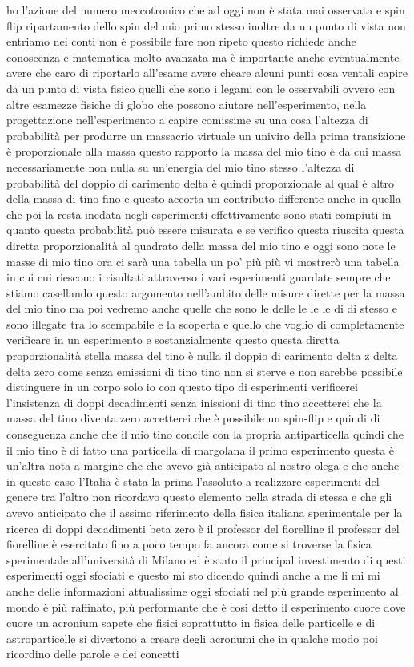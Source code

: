ho l'azione del numero meccotronico che ad oggi non è stata mai osservata e spin flip ripartamento dello spin del mio primo stesso inoltre da un punto di vista non entriamo nei conti non è possibile fare non ripeto questo richiede anche conoscenza e matematica molto avanzata ma è importante anche eventualmente avere che caro di riportarlo all'esame avere cheare alcuni punti cosa ventali capire da un punto di vista fisico quelli che sono i legami con le osservabili ovvero con altre esamezze fisiche di globo che possono aiutare nell'esperimento, nella progettazione nell'esperimento a capire comissime su una cosa l'altezza di probabilità per produrre un massacrio virtuale un univiro della prima transizione è proporzionale alla massa questo rapporto la massa del mio tino è da cui massa necessariamente non nulla su un'energia del mio tino stesso l'altezza di probabilità del doppio di carimento delta è quindi proporzionale al qual è altro della massa di tino fino e questo accorta un contributo differente anche in quella che poi la resta inedata negli esperimenti effettivamente sono stati compiuti in quanto questa probabilità può essere misurata e se verifico questa riuscita questa diretta proporzionalità al quadrato della massa del mio tino e oggi sono note le masse di mio tino ora ci sarà una tabella un po' più più vi mostrerò una tabella in cui cui riescono i risultati attraverso i vari esperimenti guardate sempre che stiamo casellando questo argomento nell'ambito delle misure dirette per la massa del mio tino ma poi vedremo anche quelle che sono le delle le le le di di stesso e sono illegate tra lo scempabile e la scoperta e quello che voglio di completamente verificare in un esperimento e sostanzialmente questo questa diretta proporzionalità stella massa del tino è nulla il doppio di carimento delta z delta delta zero come senza emissioni di tino tino non si sterve e non sarebbe possibile distinguere in un corpo solo io con questo tipo di esperimenti verificerei l'insistenza di doppi decadimenti senza inissioni di tino tino accetterei che la massa del tino diventa zero accetterei che è possibile un spin-flip e quindi di conseguenza anche che il mio tino concile con la propria antiparticella quindi che il mio tino è di fatto una particella di margolana il primo esperimento questa è un'altra nota a margine che che avevo già anticipato al nostro olega e che anche in questo caso l'Italia è stata la prima l'assoluto a realizzare esperimenti del genere tra l'altro non ricordavo questo elemento nella strada di stessa e che gli avevo anticipato che il assimo riferimento della fisica italiana sperimentale per la ricerca di doppi decadimenti beta zero è il professor del fiorelline il professor del fiorelline è esercitato fino a poco tempo fa ancora come si troverse la fisica sperimentale all'università di Milano ed è stato il principal investimento di questi esperimenti oggi sfociati e questo mi sto dicendo quindi anche a me li mi mi anche delle informazioni attualissime oggi sfociati nel più grande esperimento al mondo è più raffinato, più performante che è così detto il esperimento cuore dove cuore un acronium sapete che fisici soprattutto in fisica delle particelle e di astroparticelle si divertono a creare degli acronumi che in qualche modo poi ricordino delle parole e dei concetti 